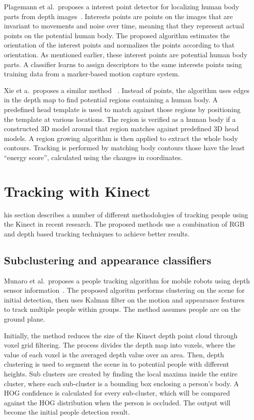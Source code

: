 Plagemann et al.\ proposes a interest point detector for localizing human body parts from depth images~\cite{plagemann_body_from_depth}. Interests points are points on the images that are invariant to movements and noise over time, meaning that they represent actual points on the potential human body. The proposed algorithm estimates the orientation of the interest points and normalizes the points according to that orientation. As mentioned earlier, these interest points are potential human body parts. A classifier learns to assign descriptors to the same interests points using training data from a marker-based motion capture system.

Xie et a.\ proposes a similar method ~\cite{xia_2d_depth_3d_model}. Instead of points, the algorithm uses edges in the depth map to find potential regions containing a human body. A predefined head template is used to match against those regions by positioning the template at various locations. The region is verified as a human body if a constructed 3D model around that region matches against predefined 3D head models. A region growing algorithm is then applied to extract the whole body contours. Tracking is performed by matching body contours those have the least ``energy score'', calculated using the changes in coordinates.

\section{Tracking with Kinect}

his section describes a number of different methodologies of tracking people using the Kinect in recent research. The proposed methods use a combination of RGB and depth based tracking techniques to achieve better results.

\subsection{Subclustering and appearance classifiers}

Munaro et al.\ proposes a people tracking algorithm for mobile robots using depth sensor information~\cite{munaro_tracking_within_groups_with_mobile_robot, munaro_tracking_2}. The proposed algoritm performs clustering on the scene for initial detection, then uses Kalman filter on the motion and appearance features to track multiple people within groups. The method assumes people are on the ground plane.

Initially, the method reduces the size of the Kinect depth point cloud through voxel grid filtering. The process divides the depth map into voxels, where the value of each voxel is the averaged depth value over an area. Then, depth clustering is used to segment the scene in to potential people with different heights. Sub clusters are created by finding the local maxima inside the entire cluster, where each sub-cluster is a bounding box enclosing a person's body. A HOG confidence is calculated for every sub-cluster, which will be compared against the HOG distribution when the person is occluded. The output will become the initial people detection result.


